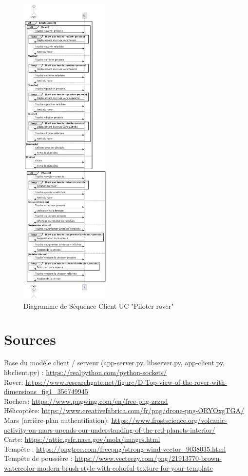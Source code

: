 \documentclass[12pt,a4paper]{scrartcl}
\begin{document}
\begin{figure}[p]
    \centering
    \includegraphics[width=0.4\textwidth]{diag_seq_piloter_rover.png}
    \caption{Diagramme de Séquence Client UC "Piloter rover" }\label{seq2_client}
\end{figure}

\section{Sources}
Base du modèle client / serveur (app-server.py, libserver.py, app-client.py, libclient.py) : \url{https://realpython.com/python-sockets/}\\
Rover: \url{https://www.researchgate.net/figure/D-Top-view-of-the-rover-with-dimensions_fig1_356749945}\\
Rochers: \url{https://www.pngwing.com/en/free-png-zrzud}\\
Hélicoptère: \url{https://www.creativefabrica.com/fr/png/drone-png-ORYOxgTGA/}\\
Mars (arrière-plan authentifiation): \url{https://www.frostscience.org/volcanic-activity-on-mars-upends-our-understanding-of-the-red-planets-interior/}\\
Carte: \url{https://attic.gsfc.nasa.gov/mola/images.html}\\
Tempête : \url{https://pngtree.com/freepng/strong-wind-vector_9038035.html}\\
Tempête de poussière : \url{https://www.vecteezy.com/png/21913770-brown-watercolor-modern-brush-style-with-colorful-texture-for-your-template}\\
\end{document}
